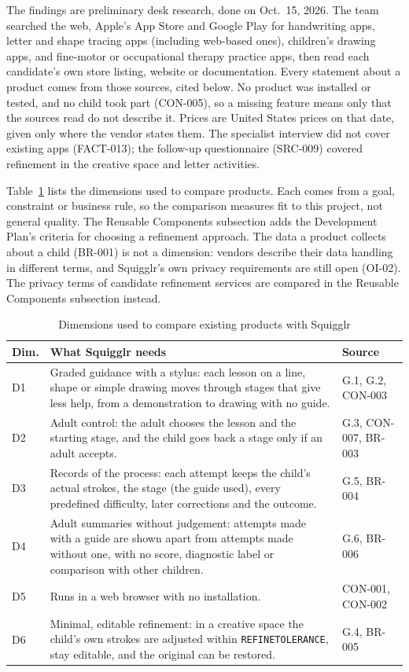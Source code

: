 \documentclass[12pt]{article}
\renewcommand{\_}{\textunderscore\allowbreak}%
\begin{document}
The findings are preliminary desk research, done on Oct.\ 15, 2026. The team
searched the web, Apple's App Store and Google Play for handwriting apps, letter
and shape tracing apps (including web-based ones), children's drawing apps, and
fine-motor or occupational therapy practice apps, then read each candidate's own
store listing, website or documentation. Every statement about a product comes
from those sources, cited below. No product was installed or tested, and no
child took part (CON-005), so a missing feature means only that the sources read
do not describe it. Prices are United States prices on that date, given only
where the vendor states them. The specialist interview did not cover existing
apps (FACT-013); the follow-up questionnaire (SRC-009) covered refinement in the
creative space and letter activities.

Table~\ref{tab:ots-dimensions} lists the dimensions used to compare products.
Each comes from a goal, constraint or business rule, so the comparison measures
fit to this project, not general quality. The Reusable Components subsection
adds the Development Plan's criteria for choosing a refinement approach. The
data a product collects about a child (BR-001) is not a dimension: vendors
describe their data handling in different terms, and Squigglr's own privacy
requirements are still open (OI-02). The privacy terms of candidate refinement
services are compared in the Reusable Components subsection instead.

\begin{table}[H]
\centering
\small
\caption{Dimensions used to compare existing products with Squigglr}
\label{tab:ots-dimensions}
\begin{tabularx}{\textwidth}{@{}l>{\raggedright\arraybackslash}X%
>{\raggedright\arraybackslash}p{}@{}}
\toprule
\textbf{Dim.} & \textbf{What Squigglr needs} & \textbf{Source} \\
\midrule
D1 & Graded guidance with a stylus: each lesson on a line, shape or simple
drawing moves through stages that give less help, from a demonstration to
drawing with no guide. & G.1, G.2, CON-003 \\
D2 & Adult control: the adult chooses the lesson and the starting stage, and the
child goes back a stage only if an adult accepts. & G.3, CON-007, BR-003 \\
D3 & Records of the process: each attempt keeps the child's actual strokes, the
stage (the guide used), every predefined difficulty, later corrections and the
outcome. & G.5, BR-004 \\
D4 & Adult summaries without judgement: attempts made with a guide are shown
apart from attempts made without one, with no score, diagnostic label or
comparison with other children. & G.6, BR-006 \\
D5 & Runs in a web browser with no installation. & CON-001, CON-002 \\
D6 & Minimal, editable refinement: in a creative space the child's own strokes
are adjusted within \texttt{REFINE\_TOLERANCE}, stay editable, and the original
can be restored. & G.4, BR-005 \\
\bottomrule
\end{tabularx}
\end{table}
\end{document}
